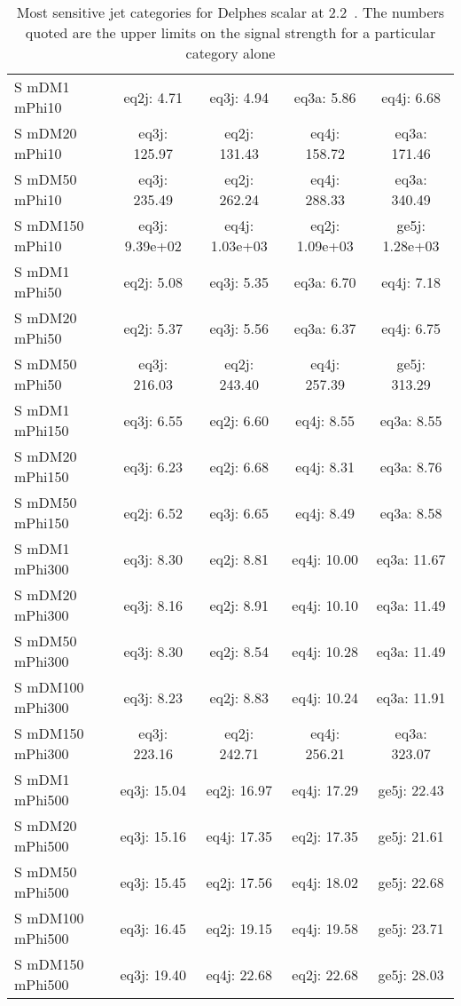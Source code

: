 \begin{table}
\begin{center}
\footnotesize
\caption{Most sensitive jet categories for Delphes scalar at 2.2~\ifb. The numbers quoted are the upper limits on the signal strength for a particular category alone}
\begin{tabular}{|l|c|c|c|c|}
\hline
 S mDM1 mPhi10 & eq2j: 4.71 & eq3j: 4.94 & eq3a: 5.86 & eq4j: 6.68 \\ 
 S mDM20 mPhi10 & eq3j: 125.97 & eq2j: 131.43 & eq4j: 158.72 & eq3a: 171.46 \\ 
 S mDM50 mPhi10 & eq3j: 235.49 & eq2j: 262.24 & eq4j: 288.33 & eq3a: 340.49 \\ 
 S mDM150 mPhi10 & eq3j: 9.39e+02 & eq4j: 1.03e+03 & eq2j: 1.09e+03 & ge5j: 1.28e+03 \\ 
 S mDM1 mPhi50 & eq2j: 5.08 & eq3j: 5.35 & eq3a: 6.70 & eq4j: 7.18 \\ 
 S mDM20 mPhi50 & eq2j: 5.37 & eq3j: 5.56 & eq3a: 6.37 & eq4j: 6.75 \\ 
 S mDM50 mPhi50 & eq3j: 216.03 & eq2j: 243.40 & eq4j: 257.39 & ge5j: 313.29 \\ 
 S mDM1 mPhi150 & eq3j: 6.55 & eq2j: 6.60 & eq4j: 8.55 & eq3a: 8.55 \\ 
 S mDM20 mPhi150 & eq3j: 6.23 & eq2j: 6.68 & eq4j: 8.31 & eq3a: 8.76 \\ 
 S mDM50 mPhi150 & eq2j: 6.52 & eq3j: 6.65 & eq4j: 8.49 & eq3a: 8.58 \\ 
 S mDM1 mPhi300 & eq3j: 8.30 & eq2j: 8.81 & eq4j: 10.00 & eq3a: 11.67 \\ 
 S mDM20 mPhi300 & eq3j: 8.16 & eq2j: 8.91 & eq4j: 10.10 & eq3a: 11.49 \\ 
 S mDM50 mPhi300 & eq3j: 8.30 & eq2j: 8.54 & eq4j: 10.28 & eq3a: 11.49 \\ 
 S mDM100 mPhi300 & eq3j: 8.23 & eq2j: 8.83 & eq4j: 10.24 & eq3a: 11.91 \\ 
 S mDM150 mPhi300 & eq3j: 223.16 & eq2j: 242.71 & eq4j: 256.21 & eq3a: 323.07 \\ 
 S mDM1 mPhi500 & eq3j: 15.04 & eq2j: 16.97 & eq4j: 17.29 & ge5j: 22.43 \\ 
 S mDM20 mPhi500 & eq3j: 15.16 & eq4j: 17.35 & eq2j: 17.35 & ge5j: 21.61 \\ 
 S mDM50 mPhi500 & eq3j: 15.45 & eq2j: 17.56 & eq4j: 18.02 & ge5j: 22.68 \\ 
 S mDM100 mPhi500 & eq3j: 16.45 & eq2j: 19.15 & eq4j: 19.58 & ge5j: 23.71 \\ 
 S mDM150 mPhi500 & eq3j: 19.40 & eq4j: 22.68 & eq2j: 22.68 & ge5j: 28.03 \\ 
\hline
\end{tabular}
\end{center}
\label{tab:msb_ScorpionDMS}
\end{table}


